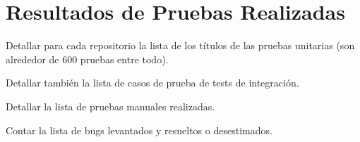 \chapter{Resultados de Pruebas Realizadas}
\label{cp:tests-execution-results}

Detallar para cada repositorio la lista de los títulos de las pruebas unitarias (son alrededor de 600 pruebas entre todo). 

Detallar también la lista de casos de prueba de tests de integración.

Detallar la lista de pruebas manuales realizadas.

Contar la lista de bugs levantados y resueltos o desestimados.
